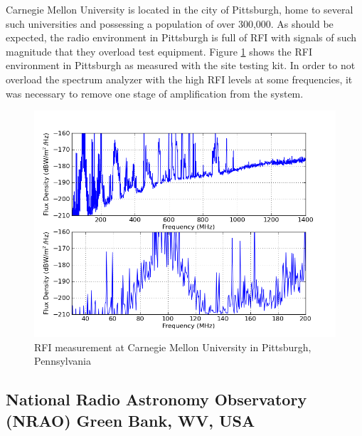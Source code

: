 Carnegie Mellon University is located in the city of Pittsburgh, home to several such universities and possessing a population of over 300,000. As should be expected, the radio environment in Pittsburgh is full of RFI with signals of such magnitude that they overload test equipment. Figure \ref{Fig:pghcal} shows the RFI environment in Pittsburgh as measured with the site testing kit. In order to not overload the spectrum analyzer with the high RFI levels at some frequencies, it was necessary to remove one stage of amplification from the system. 

\begin{figure}[htb]
\begin{center}
\includegraphics[width=0.95\linewidth]{RFI_testing/figures/Pittsburgh_cal.png}
\caption{RFI measurement at Carnegie Mellon University in Pittsburgh, Pennsylvania}
\label{Fig:pghcal}
\end{center}
\end{figure}

\subsection{National Radio Astronomy Observatory (NRAO) Green Bank, WV, USA}


